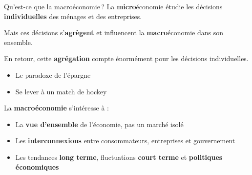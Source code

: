 \documentclass[aspectratio=169]{beamer}
\begin{document}
\begin{frame}[t]{Qu'est-ce que la macroéconomie\,?}
   \small
   La \textbf{micro}économie étudie les décisions \textbf{individuelles} des ménages et des entreprises.
   \par\vspace{0.2cm}
   Mais ces décisions s'\textbf{agrègent} et influencent la \textbf{macro}économie dans son ensemble.
   \par\vspace{0.2cm}
   En retour, cette \textbf{agrégation} compte énormément pour les décisions individuelles.
   \vspace{0.15cm}
   \begin{itemize}
      \setlength\itemsep{0.15cm}
      \item Le paradoxe de l'épargne
      \item Se lever à un match de hockey
   \end{itemize}
   \par\vspace{0.3cm}
   La \textbf{macroéconomie} s'intéresse à :
   \vspace{0.15cm}
   \begin{itemize}
      \setlength\itemsep{0.15cm}
      \item La \textbf{vue d'ensemble} de l'économie, pas un marché isolé
      \item Les \textbf{interconnexions} entre consommateurs, entreprises et gouvernement
      \item Les tendances \textbf{long terme}, fluctuations \textbf{court terme} et \textbf{politiques économiques}
   \end{itemize}
\end{frame}
\end{document}
